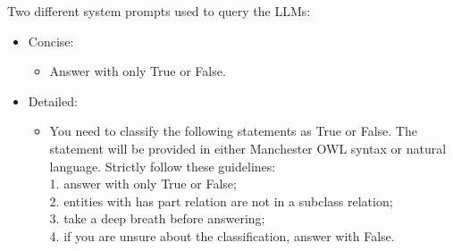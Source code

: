\documentclass[handout]{beamer}\mode<handout>{\usetheme{AMSBolognaFC}}
\begin{document}
\begin{frame}[c,allowframebreaks]
    Two different system prompts used to query the LLMs:
    \begin{itemize}
        \item Concise:
        \begin{itemize}
            \item Answer with only True or False.
        \end{itemize}
        \item Detailed:
        \begin{itemize}
            \item You need to classify the following statements as True or False.
            The statement will be provided in either Manchester OWL syntax or natural language.
            Strictly follow these guidelines:\\
            1. answer with only True or False;\\
            2. entities with has part relation are not in a subclass relation;\\
            3. take a deep breath before answering;\\
            4. if you are unsure about the classification, answer with False.
        \end{itemize}
    \end{itemize}

\end{frame}

\section*{}
\frame{\titlepage}

\section*{\bibname}
\end{document}
